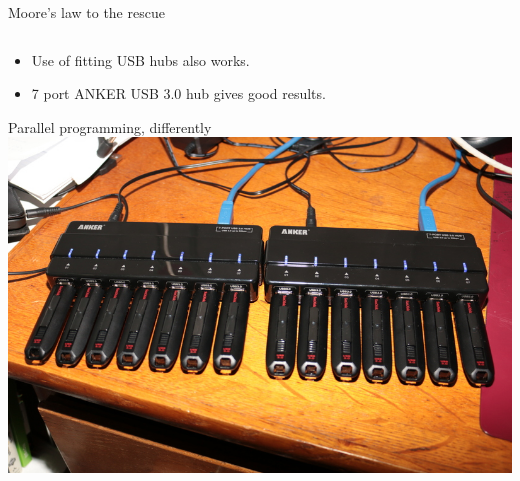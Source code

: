 \begin{frame}{Moore's law to the rescue}
\begin{columns}
\begin{column}{.35\textwidth}
    \end{column}
  \end{columns}
  \begin{itemize}
  \item Use of fitting USB hubs also works.
  \item 7 port ANKER USB 3.0 hub gives good results. 
  \end{itemize}
\end{frame}

\begin{frame}{Parallel programming, differently}
\includegraphics[width=\textwidth]{figures/14usbsticks.jpg}

\end{frame}

